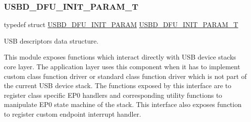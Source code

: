 \mbox{\label{group___u_s_b_d___d_f_u_ga8506b43ae2bda83cc8c459114fd3fc82}} 
\subsubsection{\texorpdfstring{U\+S\+B\+D\+\_\+\+D\+F\+U\+\_\+\+I\+N\+I\+T\+\_\+\+P\+A\+R\+A\+M\+\_\+T}{USBD\_DFU\_INIT\_PARAM\_T}}
{\footnotesize\ttfamily typedef struct \hyperlink{struct_u_s_b_d___d_f_u___i_n_i_t___p_a_r_a_m}{U\+S\+B\+D\+\_\+\+D\+F\+U\+\_\+\+I\+N\+I\+T\+\_\+\+P\+A\+R\+AM}  \hyperlink{group___u_s_b_d___d_f_u_ga8506b43ae2bda83cc8c459114fd3fc82}{U\+S\+B\+D\+\_\+\+D\+F\+U\+\_\+\+I\+N\+I\+T\+\_\+\+P\+A\+R\+A\+M\+\_\+T}}



U\+SB descriptors data structure. 

This module exposes functions which interact directly with U\+SB device stack\textquotesingle{}s core layer. The application layer uses this component when it has to implement custom class function driver or standard class function driver which is not part of the current U\+SB device stack. The functions exposed by this interface are to register class specific E\+P0 handlers and corresponding utility functions to manipulate E\+P0 state machine of the stack. This interface also exposes function to register custom endpoint interrupt handler. 